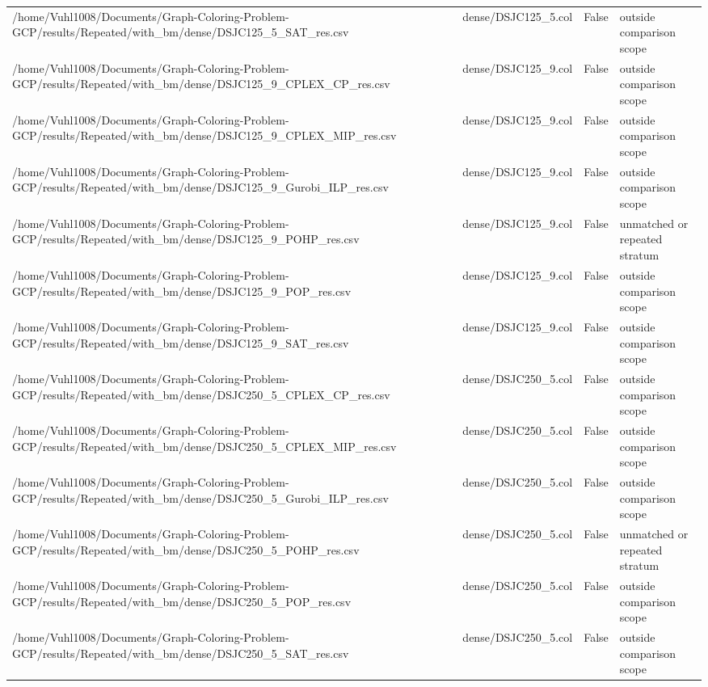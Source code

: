 \begin{table}[htbp]
\begin{tabular}{llll}
/home/Vuhl1008/Documents/Graph-Coloring-Problem-GCP/results/Repeated/with\_bm/dense/DSJC125\_5\_SAT\_res.csv & dense/DSJC125\_5.col & False & outside comparison scope \\
/home/Vuhl1008/Documents/Graph-Coloring-Problem-GCP/results/Repeated/with\_bm/dense/DSJC125\_9\_CPLEX\_CP\_res.csv & dense/DSJC125\_9.col & False & outside comparison scope \\
/home/Vuhl1008/Documents/Graph-Coloring-Problem-GCP/results/Repeated/with\_bm/dense/DSJC125\_9\_CPLEX\_MIP\_res.csv & dense/DSJC125\_9.col & False & outside comparison scope \\
/home/Vuhl1008/Documents/Graph-Coloring-Problem-GCP/results/Repeated/with\_bm/dense/DSJC125\_9\_Gurobi\_ILP\_res.csv & dense/DSJC125\_9.col & False & outside comparison scope \\
/home/Vuhl1008/Documents/Graph-Coloring-Problem-GCP/results/Repeated/with\_bm/dense/DSJC125\_9\_POHP\_res.csv & dense/DSJC125\_9.col & False & unmatched or repeated stratum \\
/home/Vuhl1008/Documents/Graph-Coloring-Problem-GCP/results/Repeated/with\_bm/dense/DSJC125\_9\_POP\_res.csv & dense/DSJC125\_9.col & False & outside comparison scope \\
/home/Vuhl1008/Documents/Graph-Coloring-Problem-GCP/results/Repeated/with\_bm/dense/DSJC125\_9\_SAT\_res.csv & dense/DSJC125\_9.col & False & outside comparison scope \\
/home/Vuhl1008/Documents/Graph-Coloring-Problem-GCP/results/Repeated/with\_bm/dense/DSJC250\_5\_CPLEX\_CP\_res.csv & dense/DSJC250\_5.col & False & outside comparison scope \\
/home/Vuhl1008/Documents/Graph-Coloring-Problem-GCP/results/Repeated/with\_bm/dense/DSJC250\_5\_CPLEX\_MIP\_res.csv & dense/DSJC250\_5.col & False & outside comparison scope \\
/home/Vuhl1008/Documents/Graph-Coloring-Problem-GCP/results/Repeated/with\_bm/dense/DSJC250\_5\_Gurobi\_ILP\_res.csv & dense/DSJC250\_5.col & False & outside comparison scope \\
/home/Vuhl1008/Documents/Graph-Coloring-Problem-GCP/results/Repeated/with\_bm/dense/DSJC250\_5\_POHP\_res.csv & dense/DSJC250\_5.col & False & unmatched or repeated stratum \\
/home/Vuhl1008/Documents/Graph-Coloring-Problem-GCP/results/Repeated/with\_bm/dense/DSJC250\_5\_POP\_res.csv & dense/DSJC250\_5.col & False & outside comparison scope \\
/home/Vuhl1008/Documents/Graph-Coloring-Problem-GCP/results/Repeated/with\_bm/dense/DSJC250\_5\_SAT\_res.csv & dense/DSJC250\_5.col & False & outside comparison scope \\

\end{tabular}
\end{table}
